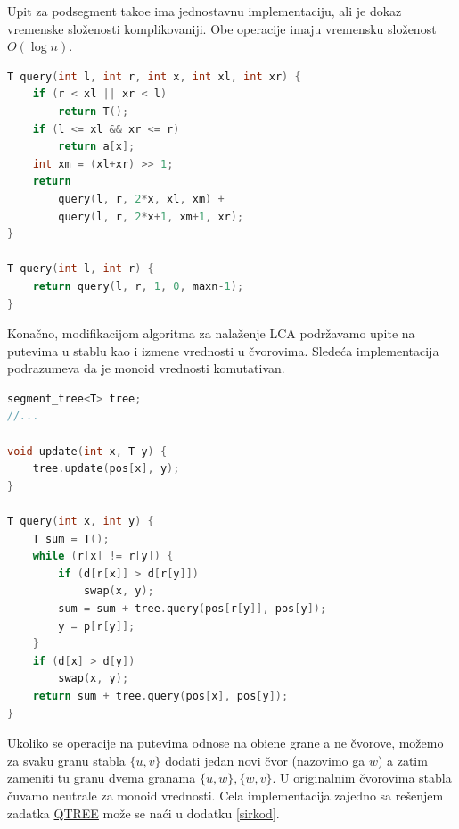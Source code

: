 Upit za podsegment tako\dj e ima jednostavnu implementaciju, ali je dokaz vremenske slo\v zenosti komplikovaniji. Obe operacije imaju vremensku slo\v zenost $O(\log n)$.

\noindent
\begin{minipage}{\textwidth}
\begin{lstlisting}[language=C++, title={Upit za sumu podsegmenta u segmentnom stablu:}, style=customcpp]
T query(int l, int r, int x, int xl, int xr) {
	if (r < xl || xr < l)
		return T();
	if (l <= xl && xr <= r)
		return a[x];
	int xm = (xl+xr) >> 1;
	return
		query(l, r, 2*x, xl, xm) +
		query(l, r, 2*x+1, xm+1, xr);
}

T query(int l, int r) {
	return query(l, r, 1, 0, maxn-1);
}
\end{lstlisting}
\end{minipage}

Kona\v cno, modifikacijom algoritma za nala\v zenje LCA podr\v zavamo upite na putevima u stablu kao i izmene vrednosti u \v cvorovima. Slede\' ca implementacija podrazumeva da je monoid vrednosti komutativan.

\noindent
\begin{minipage}{\textwidth}
\begin{lstlisting}[language=C++, title={Operacije na putevima sa izmenama:}, style=customcpp]
segment_tree<T> tree;
//...

void update(int x, T y) {
	tree.update(pos[x], y);
}

T query(int x, int y) {
	T sum = T();
	while (r[x] != r[y]) {
		if (d[r[x]] > d[r[y]])
			swap(x, y);
		sum = sum + tree.query(pos[r[y]], pos[y]);
		y = p[r[y]];
	}
	if (d[x] > d[y])
		swap(x, y);
	return sum + tree.query(pos[x], pos[y]);
}
\end{lstlisting}
\end{minipage}

Ukoliko se operacije na putevima odnose na obi\dj ene grane a ne \v cvorove, mo\v zemo za svaku granu stabla $\{u, v\}$ dodati jedan novi \v cvor (nazovimo ga $w$) a zatim zameniti tu granu dvema granama $\{u, w\}, \{w, v\}$. U originalnim \v cvorovima stabla \v cuvamo neutrale za monoid vrednosti. Cela implementacija zajedno sa re\v senjem zadatka \href{https://spoj.com/problems/QTREE}{QTREE} mo\v ze se na\' ci u dodatku \ref{sirkod}.